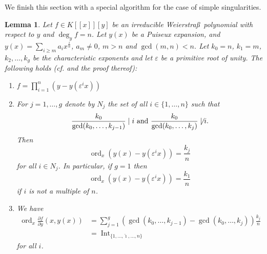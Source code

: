 \documentclass[a4paper,11pt]{amsart}%
\theoremstyle{definition}
\theoremstyle{plain}
\newtheorem{lemma}[defn]{Lemma}
\theoremstyle{remark}
\begin{document}
We finish this section with a special algorithm for the case of simple singularities.

\begin{lemma}
Let $f\in K[[x]][y]$ be an irreducible Weierstra\ss \ polynomial with respect
to $y$ and $\deg_{y}f=n$. Let $y(x)$ be a Puiseux expansion, and
$y(x)=\sum_{i\geq m}a_{i}x^{\frac{i}{n}}$, $a_{m}\neq0$, $m>n$ and
$\gcd(m,n)<n$. Let $k_{0}=n$, $k_{1}=m$, $k_{2},\ldots,k_{g}$ be the
characteristic exponents and let $\varepsilon$ be a primitive root of unity.
The following holds (cf. \cite[Lemma 5.2.18(1)]{JP} and the proof thereof):

\begin{enumerate}
\item $f=%
{\displaystyle\prod\limits_{i=1}^{n}}
(y-y(\varepsilon^{i}x))$

\item For $j=1,\ldots,g$ denote by $N_{j}$ the set of all $i\in\{1,\ldots,n\}$
such that%
\[
\frac{k_{0}}{\gcd(k_{0},\ldots,k_{j-1})}\mid i\text{ and }\frac{k_{0}}%
{\gcd(k_{0},\ldots,k_{j})}\not \mid i\text{.}%
\]
Then%
\[
\operatorname{ord}_{x}(y(x)-y(\varepsilon^{i}x))=\frac{k_{j}}{n}%
\]
for all $i\in N_{j}$. In particular, if $g=1$ then%
\[
\operatorname{ord}_{x}(y(x)-y(\varepsilon^{i}x))=\frac{k_{1}}{n}%
\]
if $i$ is not a multiple of $n$.

\item We have%
\begin{align*}
\operatorname{ord}_{x}\frac{\partial f}{\partial y}(x,y(x)) &  =\sum_{j=1}%
^{g}\left(  \gcd(k_{0},\ldots,k_{j-1})-\gcd(k_{0},\ldots,k_{j})\right)
\frac{k_{j}}{n}\\
&  =\operatorname*{Int}\nolimits_{\{1,\ldots,\hat{\imath},\ldots,n\}}%
\end{align*}
for all $i$.
\end{enumerate}
\end{lemma}
\end{document}
